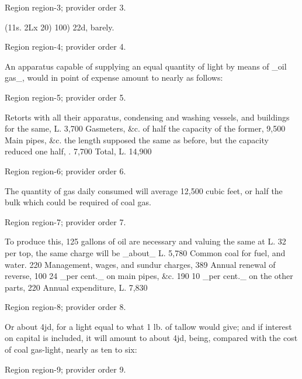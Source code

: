 \documentclass[11pt]{article}
\begin{document}
{\scriptsize\color{gray} Region region-3; provider order 3.\par}
\medskip

(11s. 2Lx 20) 100) 22d, barely.
\par

{\scriptsize\color{gray} Region region-4; provider order 4.\par}
\medskip

An apparatus capable of supplying an equal quantity of light by means of \_oil gas\_, would in point of expense amount to nearly as follows:
\par

{\scriptsize\color{gray} Region region-5; provider order 5.\par}
\medskip

Retorts with all their apparatus, condensing and washing vessels, and buildings for the same, L. 3,700 Gasmeters, \&c. of half the capacity of the former, 9,500 Main pipes, \&c. the length supposed the same as before, but the capacity reduced one half, . 7,700 Total, L. 14,900
\par

{\scriptsize\color{gray} Region region-6; provider order 6.\par}
\medskip

The quantity of gas daily consumed will average 12,500 cubic feet, or half the bulk which could be required of coal gas.
\par

{\scriptsize\color{gray} Region region-7; provider order 7.\par}
\medskip

To produce this, 125 gallons of oil are necessary and valuing the same at L. 32 per top, the same charge will be \_about\_ L. 5,780 Common coal for fuel, and water. 220 Management, wages, and sundur charges, 389 Annual renewal of reverse, 100 24 \_per cent.\_ on main pipes, \&c. 190 10 \_per cent.\_ on the other parts, 220 Annual expenditure, L. 7,830
\par

{\scriptsize\color{gray} Region region-8; provider order 8.\par}
\medskip

Or about 4jd, for a light equal to what 1 lb. of tallow would give; and if interest on capital is included, it will amount to about 4jd, being, compared with the cost of coal gas-light, nearly as ten to six:
\par

{\scriptsize\color{gray} Region region-9; provider order 9.\par}
\medskip
\end{document}
